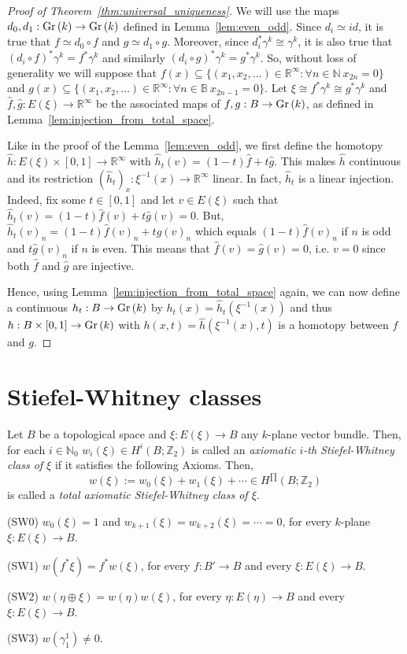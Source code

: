 \begin{proof}[Proof of Theorem~\ref{thm:universal_uniqueness}] We will use the maps $d_0,d_1:\Gr{k}\to\Gr{k}$ defined in Lemma~\ref{lem:even_odd}. Since $d_i\simeq id$, it is true that $f\simeq d_0\circ f$ and $g\simeq d_1\circ g$. Moreover, since $d_i^*\gamma^k\cong\gamma^k$, it is also true that $(d_i\circ f)^*\gamma^k=f^*\gamma^k$ and similarly $(d_i\circ g)^*\gamma^k=g^*\gamma^k$. So, without loss of generality we will suppose that $f(x)\subseteq\{(x_1,x_2,\ldots)\in\mathbb{R}^{\infty}:\forall n\in\mathbb{N}\ x_{2n}=0\}$ and $g(x)\subseteq\{(x_1,x_2,\ldots)\in\mathbb{R}^{\infty}:\forall n\in\mathbb{B}\ x_{2n-1}=0\}$. Let $\xi\cong f^*\gamma^k\cong g^*\gamma^k$ and $\hat{f},\hat{g}:E(\xi)\to\mathbb{R}^{\infty}$ be the associated maps of $f,g:B\to\Gr{k}$, as defined in Lemma~\ref{lem:injection_from_total_space}.

Like in the proof of the Lemma~\ref{lem:even_odd}, we first define the homotopy $\hat{h}:E(\xi)\times[0,1]\to\mathbb{R}^{\infty}$ with $\hat{h}_t(v)=(1-t)\hat{f}+t\hat{g}$. This makes $\hat{h}$ continuous and its restriction $(\hat{h}_t)_x:\xi^{-1}(x)\to\mathbb{R}^{\infty}$ linear. In fact, $\hat{h}_t$ is a linear injection. Indeed, fix some $t\in[0,1]$ and let $v\in E(\xi)$ such that $\hat{h}_t(v)=(1-t)\hat{f}(v)+t\hat{g}(v)=0$. But, $\hat{h}_t(v)_n=(1-t)\hat{f}(v)_n+t\hat{g}(v)_n$ which equals $(1-t)\hat{f}(v)_n$ if $n$ is odd and $t\hat{g}(v)_n$ if $n$ is even. This means that $\hat{f}(v)=\hat{g}(v)=0$, i.e. $v=0$ since both $\hat{f}$ and $\hat{g}$ are injective.

Hence, using Lemma~\ref{lem:injection_from_total_space} again, we can now define a continuous $h_t:B\to\Gr{k}$ by $h_t(x)=\hat{h}_t(\xi^{-1}(x))$ and thus $h:B\times[0,1]\to\Gr{k}$ with $h(x,t)=\hat{h}(\xi^{-1}(x),t)$ is a homotopy between $f$ and $g$.
\end{proof}

\section{Stiefel-Whitney classes}
\begin{axioms} Let $B$ be a topological space and $\xi:E(\xi)\to B$ any $k$-plane vector bundle. Then, for each $i\in\mathbb{N}_0$ $w_i(\xi)\in H^i(B;\mathbb{Z}_2)$ is called an \emph{axiomatic $i$-th Stiefel-Whitney class of $\xi$} if it satisfies the following Axioms. Then,
\[w(\xi):=w_0(\xi)+w_1(\xi)+\cdots\in H^{\prod}(B;\mathbb{Z}_2)\]
is called a \emph{total axiomatic Stiefel-Whitney class of $\xi$}.
\begin{b_item}
\item[(SW0)] $w_0(\xi)=1$ and $w_{k+1}(\xi)=w_{k+2}(\xi)=\cdots=0$, for every $k$-plane $\xi:E(\xi)\to B$.
\item[(SW1)] $w(f^*\xi)=f^*w(\xi)$, for every $f:B'\to B$ and every $\xi:E(\xi)\to B$.
\item[(SW2)] $w(\eta\oplus\xi)=w(\eta)w(\xi)$, for every $\eta:E(\eta)\to B$ and every $\xi:E(\xi)\to B$.
\item[(SW3)] $w(\gamma_1^1)\neq0$.
\end{b_item}
\end{axioms}

